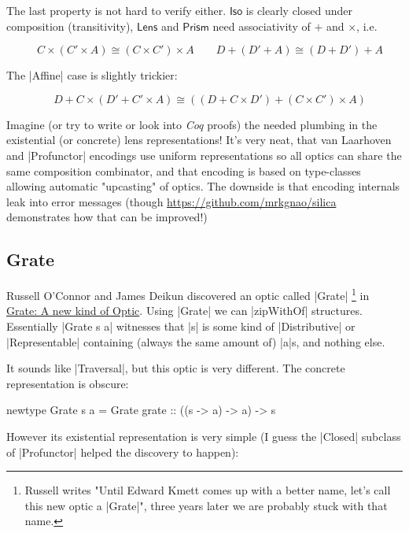 \documentclass{article}
\begin{document}
The last property is not hard to verify either. $\mathsf{Iso}$ is clearly
closed under composition (transitivity), $\mathsf{Lens}$ and $\mathsf{Prism}$
need associativity of $+$ and $\times$, i.e.

\begin{equation}
  \quad C \times (C' \times A) \cong (C \times C') \times A
  \qquad D + (D' + A) \cong (D + D') + A
\end{equation}

The |Affine| case is slightly trickier:

\begin{equation}
  \quad D + C \times (D' + C' \times A) \cong ((D + C \times D')+ (C \times C') \times A)
\end{equation}

Imagine (or try to write or look into \emph{Coq} proofs) the needed plumbing in the
existential (or concrete) lens representations! It's very neat, that
van Laarhoven and |Profunctor| encodings use uniform representations so
all optics can share the same composition combinator, and that encoding is
based on type-classes allowing automatic "upcasting" of optics.
The downside is that encoding internals leak into error messages (though
\url{https://github.com/mrkgnao/silica} demonstrates how that can be improved!)

\subsection{Grate}

Russell O'Connor and James Deikun discovered an optic called |Grate|
\footnote{Russell writes "Until Edward Kmett comes up with a better name, let's call this new optic a |Grate|",
three years later we are probably stuck with that name.}
in \href{https://r6research.livejournal.com/28050.html}{Grate: A new kind of
Optic}.  Using |Grate| we can |zipWithOf| structures. Essentially |Grate s a|
witnesses that |s| is some kind of |Distributive| or |Representable| containing
(always the same amount of) |a|s, and nothing else.

It sounds like |Traversal|, but this optic is very different.
The concrete representation is obscure:

\begin{code}
newtype Grate s a = Grate { grate :: ((s -> a) -> a) -> s }
\end{code}

However its existential representation is very simple
(I guess the |Closed| subclass of |Profunctor| helped the discovery to happen):
\end{document}
